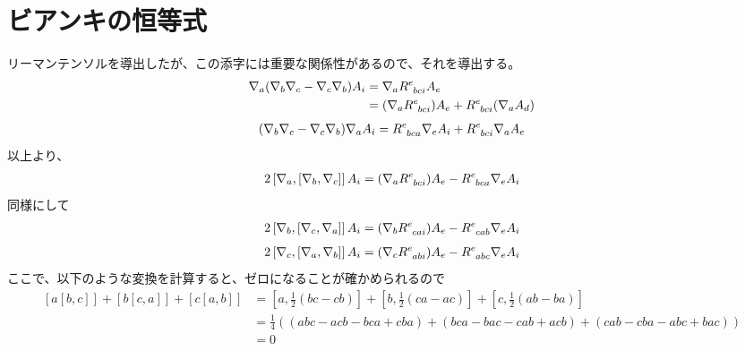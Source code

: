 \documentclass[dvipdfmx]{report} %
\begin{document}
\section{
	ビアンキの恒等式
}
リーマンテンソルを導出したが、この添字には重要な関係性があるので、それを導出する。\\
\begin{equation*}
\begin{split}
	\nabla_a (\nabla_b \nabla_c - \nabla_c \nabla_b) A_i &= \nabla_a \tensor{R}{^e_{bci}} A_e\\
	&= (\nabla_a \tensor{R}{^e_{bci}}) A_e + \tensor{R}{^e_{bci}} (\nabla_a A_d)
\end{split}
\end{equation*}
\begin{equation*}
\begin{split}
	(\nabla_b\nabla_c - \nabla_c\nabla_b) \nabla_a A_i &= \tensor{R}{^e_{bca}} \nabla_e A_i + \tensor{R}{^e_{bci}} \nabla_a A_e\\
\end{split}
\end{equation*}
以上より、
\begin{equation}
\begin{split}
	2 \left[ \nabla_a,[\nabla_b, \nabla_c] \right] A_i = (\nabla_a \tensor{R}{^e_{bci}}) A_e - \tensor{R}{^e_{bca}} \nabla_e A_i\\
\end{split}
\end{equation}
同様にして
\begin{equation}
\begin{split}
	2 \left[ \nabla_b,[\nabla_c, \nabla_a] \right] A_i = (\nabla_b \tensor{R}{^e_{cai}}) A_e - \tensor{R}{^e_{cab}} \nabla_e A_i\\
\end{split}
\end{equation}
\begin{equation}
\begin{split}
	2 \left[ \nabla_c,[\nabla_a, \nabla_b] \right] A_i = (\nabla_c \tensor{R}{^e_{abi}}) A_e - \tensor{R}{^e_{abc}} \nabla_e A_i\\
\end{split}
\end{equation}
ここで、以下のような変換を計算すると、ゼロになることが確かめられるので
\begin{equation*}
\begin{split}
	\left[ a[b,c] \right] + \left[ b[c,a] \right] + \left[ c[a,b] \right]
	&= \left[ a, \frac{1}{2}(bc - cb) \right] + \left[ b, \frac{1}{2}(ca - ac) \right] + \left[ c, \frac{1}{2}(ab - ba) \right]\\
	&= \frac{1}{4} \left( (abc - acb - bca + cba) + (bca - bac - cab + acb) + (cab - cba - abc + bac) \right)\\
	&= 0
\end{split}
\end{equation*}
\end{document}
